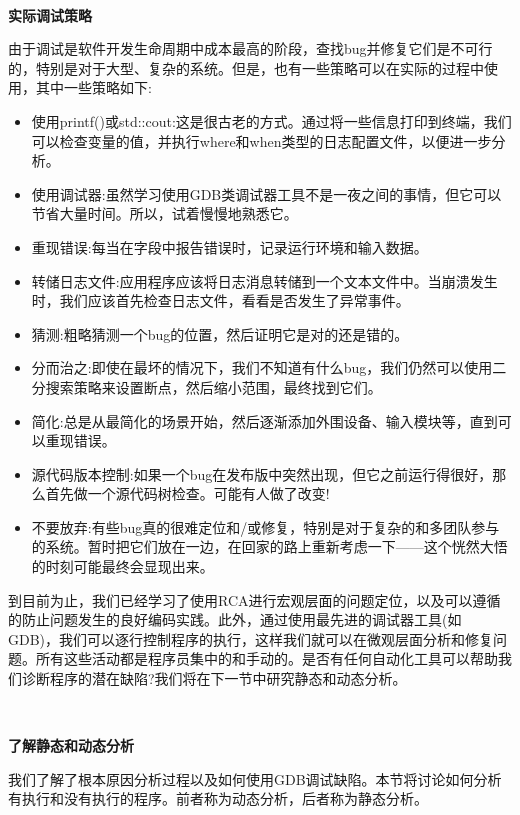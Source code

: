 \noindent\textbf{}\ \par
\textbf{实际调试策略} \ \par
由于调试是软件开发生命周期中成本最高的阶段，查找bug并修复它们是不可行的，特别是对于大型、复杂的系统。但是，也有一些策略可以在实际的过程中使用，其中一些策略如下: \par
\begin{itemize}
	\item 使用printf()或std::cout:这是很古老的方式。通过将一些信息打印到终端，我们可以检查变量的值，并执行where和when类型的日志配置文件，以便进一步分析。
	\item 使用调试器:虽然学习使用GDB类调试器工具不是一夜之间的事情，但它可以节省大量时间。所以，试着慢慢地熟悉它。
	\item 重现错误:每当在字段中报告错误时，记录运行环境和输入数据。
	\item 转储日志文件:应用程序应该将日志消息转储到一个文本文件中。当崩溃发生时，我们应该首先检查日志文件，看看是否发生了异常事件。
	\item 猜测:粗略猜测一个bug的位置，然后证明它是对的还是错的。
	\item 分而治之:即使在最坏的情况下，我们不知道有什么bug，我们仍然可以使用二分搜索策略来设置断点，然后缩小范围，最终找到它们。
	\item 简化:总是从最简化的场景开始，然后逐渐添加外围设备、输入模块等，直到可以重现错误。
	\item 源代码版本控制:如果一个bug在发布版中突然出现，但它之前运行得很好，那么首先做一个源代码树检查。可能有人做了改变!
	\item 不要放弃:有些bug真的很难定位和/或修复，特别是对于复杂的和多团队参与的系统。暂时把它们放在一边，在回家的路上重新考虑一下——这个恍然大悟的时刻可能最终会显现出来。
\end{itemize}

到目前为止，我们已经学习了使用RCA进行宏观层面的问题定位，以及可以遵循的防止问题发生的良好编码实践。此外，通过使用最先进的调试器工具(如GDB)，我们可以逐行控制程序的执行，这样我们就可以在微观层面分析和修复问题。所有这些活动都是程序员集中的和手动的。是否有任何自动化工具可以帮助我们诊断程序的潜在缺陷?我们将在下一节中研究静态和动态分析。 \par

\noindent\textbf{}\ \par
\textbf{了解静态和动态分析} \ \par
我们了解了根本原因分析过程以及如何使用GDB调试缺陷。本节将讨论如何分析有执行和没有执行的程序。前者称为动态分析，后者称为静态分析。\par

